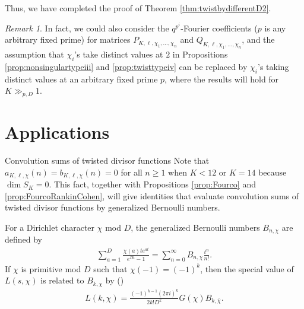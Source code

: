\documentclass[11pt,letterpaper,reqno]{amsart}
\makeatletter
\numberwithin{figure}{section}
\numberwithin{table}{section}
\theoremstyle{definition}
\theoremstyle{plain}
\theoremstyle{definition}
\theoremstyle{definition}
\theoremstyle{remark}
\newtheorem{remark}{Remark}[section]
\numberwithin{equation}{section}
\theoremstyle{remark}
\def\subsection{\@startsection{subsection}{2}%
  \z@{.5\linespacing\@plus.7\linespacing}{.3\linespacing}%
  {\normalfont\bfseries}}
\makeatother
\begin{document}
Thus, we have completed the proof of Theorem \ref{thm:twistbydifferentD2}.
\begin{remark}
    In fact, we could also consider the $q^{p^i}$-Fourier coefficients ($p$ is any arbitrary fixed prime) for matrices $P_{K,\ell,\chi_1,...,\chi_n}$ and $Q_{K,\ell,\chi_1,...,\chi_n}$, and the assumption that $\chi_i$'s take distinct values at $2$ in Propositions \ref{prop:nonsingulartypeiii} and \ref{prop:twisttypeiv} can be replaced by $\chi_i$'s taking distinct values at an arbitrary fixed prime $p$, where the results will hold for $K\gg_{p,D}1$.
\end{remark}
\section{Applications}\label{sect:applications}

\subsection{Convolution sums of twisted divisor functions}
Note that $a_{K,\ell,\chi}(n)= b_{K,\ell,\chi}(n)=0$ for all $n\ge1$ when $K<12$ or $K=14$ because $\dim S_K=0$. This fact, together with Propositions \ref{prop:Fourco} and \ref{prop:FourcoRankinCohen}, will give identities that evaluate convolution sums of twisted divisor functions by generalized Bernoulli numbers.  

For a Dirichlet character $\chi$ mod $D$, the generalized Bernoulli numbers $B_{n,\chi}$ are defined by
\begin{align*}
    \sum_{a=1}^D\frac{\chi(a)te^{at}}{e^{Dt}-1}=\sum_{n=0}^{\infty}B_{n,\chi}\frac{t^n}{n!}.
\end{align*}
If $\chi$ is primitive mod $D$ such that $\chi(-1)=(-1)^k$, then the special value of $L(s,\chi)$  is related to $B_{k,\chi}$ by (\cite[Theorems 9.6]{bernoullinumberbook})
\begin{align}
    L(k,\chi)=\frac{(-1)^{k-1}(2\pi i)^k}{2k!D^k}G(\chi)B_{k,\overline{\chi}}.\label{eq:Lseriesandbernoulli}
\end{align}
\end{document}
